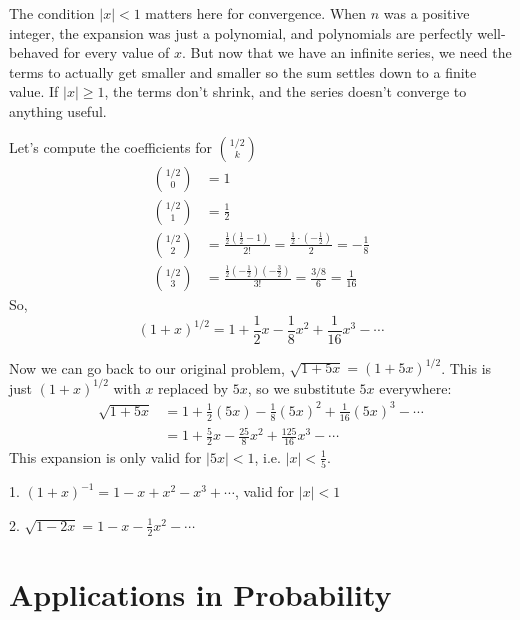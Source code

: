 The condition $|x| < 1$ matters here for convergence. When $n$ was a positive integer, the expansion was just a polynomial, and polynomials are perfectly well-behaved for every value of $x$. But now that we have an infinite series, we need the terms to actually get smaller and smaller so the sum settles down to a finite value. If $|x| \geq 1$, the terms don't shrink, and the series doesn't converge to anything useful.

Let's compute the coefficients for $\binom{1/2}{k}$
\begin{align*}
\binom{1/2}{0} &= 1 \\
\binom{1/2}{1} &= \frac{1}{2} \\
\binom{1/2}{2} &= \frac{\frac{1}{2}\left(\frac{1}{2}-1\right)}{2!} = \frac{\frac{1}{2}\cdot\left(-\frac{1}{2}\right)}{2} = -\frac{1}{8} \\
\binom{1/2}{3} &= \frac{\frac{1}{2}\left(-\frac{1}{2}\right)\left(-\frac{3}{2}\right)}{3!} = \frac{3/8}{6} = \frac{1}{16}
\end{align*}
So,
\begin{equation*}
(1+x)^{1/2} = 1 + \frac{1}{2}x - \frac{1}{8}x^2 + \frac{1}{16}x^3 - \cdots
\end{equation*}

Now we can go back to our original problem, $\sqrt{1+5x} = (1+5x)^{1/2}$. This is just $(1+x)^{1/2}$ with $x$ replaced by $5x$, so we substitute $5x$ everywhere:
\begin{align*}
\sqrt{1+5x} &= 1 + \frac{1}{2}(5x) - \frac{1}{8}(5x)^2 + \frac{1}{16}(5x)^3 - \cdots \\
&= 1 + \frac{5}{2}x - \frac{25}{8}x^2 + \frac{125}{16}x^3 - \cdots
\end{align*}
This expansion is only valid for $|5x| < 1$, i.e. $|x| < \frac{1}{5}$.

\begin{Exercise}[title={Fractional Binomial Expansion}, label=fracbinom]
\end{Exercise}
\begin{Answer}[ref=fracbinom]
  1. $(1+x)^{-1} = 1 - x + x^2 - x^3 + \cdots$, valid for $|x| < 1$

  2. $\sqrt{1-2x} = 1 - x - \frac{1}{2}x^2 - \cdots$
\end{Answer}
\section{Applications in Probability}

